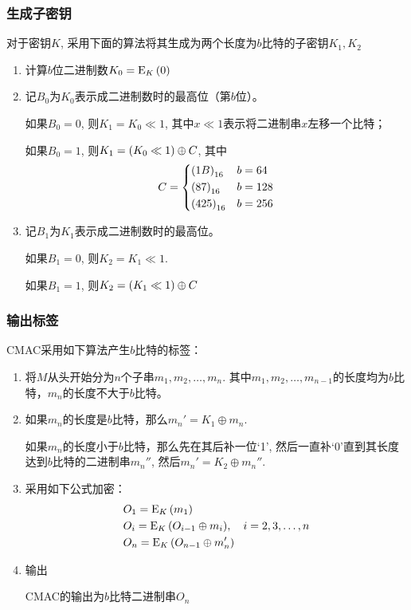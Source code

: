 \subsubsection{生成子密钥}
对于密钥$K$, 采用下面的算法将其生成为两个长度为$b$比特的子密钥$K_1, K_2$
\begin{enumerate}
	\item 计算$b$位二进制数$K_0={\mathrm{E}_{K}\left({0}\right)}$
	\item 记$B_0$为$K_0$表示成二进制数时的最高位（第$b$位）。\par
	如果$B_0=0$, 则$K_1=K_0\ll 1$, 其中$x\ll 1$表示将二进制串$x$左移一个比特；\par
	如果$B_0=1$, 则$K_1=\left( {K_0\ll 1}\right)\oplus C$, 其中
	\[C=\begin{dcases}\left( {1B}\right)_{16}&b=64\\\left( {87}\right)_{16}&b=128\\\left( {425}\right)_{16}&b=256\end{dcases}\]
	\item 记$B_1$为$K_1$表示成二进制数时的最高位。\par
	如果$B_1=0$, 则$K_2=K_1\ll 1$.\par
	如果$B_1=1$, 则$K_2=\left( {K_1\ll 1}\right)\oplus C$
\end{enumerate}
\subsubsection{输出标签}
CMAC采用如下算法产生$b$比特的标签：
\begin{enumerate}
	\item 将$M$从头开始分为$n$个子串$m_1, m_2, \ldots, m_n$. 其中$m_1, m_2,\ldots, m_{n-1}$的长度均为$b$比特，$m_n$的长度不大于$b$比特。
	\item 如果$m_n$的长度是$b$比特，那么$m_n'=K_1\oplus m_n$.\par
	如果$m_n$的长度小于$b$比特，那么先在其后补一位`1', 然后一直补`0'直到其长度达到$b$比特的二进制串$m_n''$, 然后$m_n'=K_2\oplus m_n''$.
	\item 采用如下公式加密：
	\begin{align*}
	&O_1={\mathrm{E}_{K}\left({m_1}\right)}\\
	&O_{i}={\mathrm{E}_{K}\left({O_{i-1}\oplus m_{i}}\right)},\quad i=2, 3,\ldots, n\\
	&O_n={\mathrm{E}_{K}\left({O_{n-1}\oplus m_n'}\right)}
	\end{align*}
	\item 输出\par
	CMAC的输出为$b$比特二进制串$O_n$
\end{enumerate}